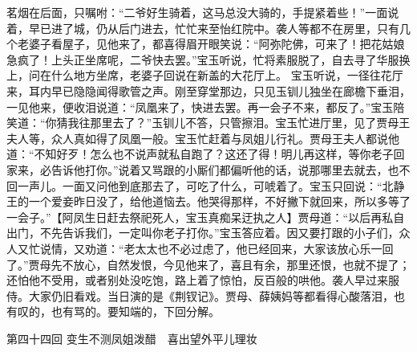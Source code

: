 \documentclass[12pt,oneside]{book}
\begin{document}
茗烟在后面，只嘱咐：“二爷好生骑着，这马总没大骑的，手提紧着些！”一面说着，早已进了城，仍从后门进去，忙忙来至怡红院中。袭人等都不在房里，只有几个老婆子看屋子，见他来了，都喜得眉开眼笑说：“阿弥陀佛，可来了！把花姑娘急疯了！上头正坐席呢，二爷快去罢。”宝玉听说，忙将素服脱了，自去寻了华服换上，问在什么地方坐席，老婆子回说在新盖的大花厅上。
宝玉听说，一径往花厅来，耳内早已隐隐闻得歌管之声。刚至穿堂那边，只见玉钏儿独坐在廊檐下垂泪，一见他来，便收泪说道：“凤凰来了，快进去罢。再一会子不来，都反了。”宝玉陪笑道：“你猜我往那里去了？”玉钏儿不答，只管擦泪。宝玉忙进厅里，见了贾母王夫人等，众人真如得了凤凰一般。宝玉忙赶着与凤姐儿行礼。贾母王夫人都说他道：“不知好歹！怎么也不说声就私自跑了？这还了得！明儿再这样，等你老子回家来，必告诉他打你。”说着又骂跟的小厮们都偏听他的话，说那哪里去就去，也不回一声儿。一面又问他到底那去了，可吃了什么，可唬着了。宝玉只回说：“北静王的一个爱妾昨日没了，给他道恼去。他哭得那样，不好撇下就回来，所以多等了一会子。”【阿凤生日赶去祭祀死人，宝玉真痴呆迂执之人】贾母道：“以后再私自出门，不先告诉我们，一定叫你老子打你。”宝玉答应着。因又要打跟的小子们，众人又忙说情，又劝道：“老太太也不必过虑了，他已经回来，大家该放心乐一回了。”贾母先不放心，自然发恨，今见他来了，喜且有余，那里还恨，也就不提了；还怕他不受用，或者别处没吃饱，路上着了惊怕，反百般的哄他。袭人早过来服侍。大家仍旧看戏。当日演的是《荆钗记》。贾母、薛姨妈等都看得心酸落泪，也有叹的，也有骂的。要知端的，下回分解。
 
第四十四回  变生不测凤姐泼醋　喜出望外平儿理妆
\end{document}
